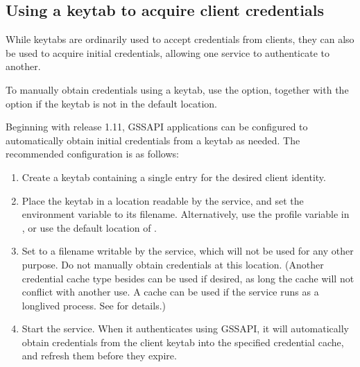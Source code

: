 \documentclass[letterpaper,10pt,english]{sphinxmanual}
\begin{document}
\subsection{Using a keytab to acquire client credentials}
\label{\detokenize{admin/appl_servers:using-a-keytab-to-acquire-client-credentials}}
\sphinxAtStartPar
While keytabs are ordinarily used to accept credentials from clients,
they can also be used to acquire initial credentials, allowing one
service to authenticate to another.

\sphinxAtStartPar
To manually obtain credentials using a keytab, use the 
 option, together with the  option if the keytab is not in
the default location.

\sphinxAtStartPar
Beginning with release 1.11, GSSAPI applications can be configured to
automatically obtain initial credentials from a keytab as needed.  The
recommended configuration is as follows:
\begin{enumerate}
%
\item {} 
\sphinxAtStartPar
Create a keytab containing a single entry for the desired client
identity.

\item {} 
\sphinxAtStartPar
Place the keytab in a location readable by the service, and set the
 environment variable to its filename.
Alternatively, use the  profile
variable in {\hyperref[\detokenize{admin/conf_files/krb5_conf:libdefaults}]{}}, or use the default location of
{\hyperref[\detokenize{mitK5defaults:paths}]{}}.

\item {} 
\sphinxAtStartPar
Set  to a filename writable by the service, which
will not be used for any other purpose.  Do not manually obtain
credentials at this location.  (Another credential cache type
besides  can be used if desired, as long the cache will not
conflict with another use.  A  cache can be used if the
service runs as a long\sphinxhyphen{}lived process.  See 
for details.)

\item {} 
\sphinxAtStartPar
Start the service.  When it authenticates using GSSAPI, it will
automatically obtain credentials from the client keytab into the
specified credential cache, and refresh them before they expire.

\end{enumerate}
\end{document}
